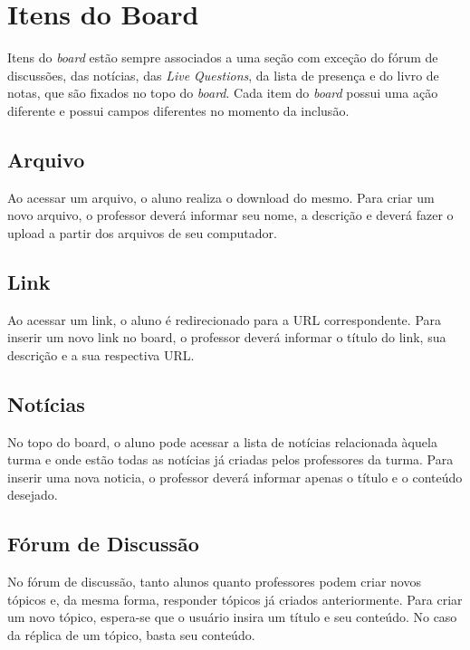 \section{Itens do Board}
\label{sec-minimundo:itens-board}

Itens do \textit{board} estão sempre associados a uma seção com exceção do fórum de discussões, das notícias, das \textit{Live Questions}, da lista de presença e do livro de notas, que são fixados no topo do \textit{board}. Cada item do \textit{board} possui uma ação diferente e possui campos diferentes no momento da inclusão.

\subsection{Arquivo}
\label{sec-minimundo:itens-board:arquivo}
Ao acessar um arquivo, o aluno realiza o download do mesmo. Para criar um novo arquivo, o professor deverá informar seu nome, a descrição e deverá fazer o upload a partir dos arquivos de seu computador.

\subsection{Link}
\label{sec-minimundo:itens-board:link}
Ao acessar um link, o aluno é redirecionado para a URL correspondente. Para inserir um novo link no board, o professor deverá informar o título do link, sua descrição e a sua respectiva URL.

\subsection{Notícias}
\label{sec-minimundo:itens-board:noticias}
No topo do board, o aluno pode acessar a lista de notícias relacionada àquela turma e onde estão todas as notícias já criadas pelos professores da turma. Para inserir uma nova noticia, o professor deverá informar apenas o título e o conteúdo desejado.

\subsection{Fórum de Discussão}
\label{sec-minimundo:itens-board:forum}
No fórum de discussão, tanto alunos quanto professores podem criar novos tópicos e, da mesma forma, responder tópicos já criados anteriormente. Para criar um novo tópico, espera-se que o usuário insira um título e seu conteúdo. No caso da réplica de um tópico, basta seu conteúdo.

